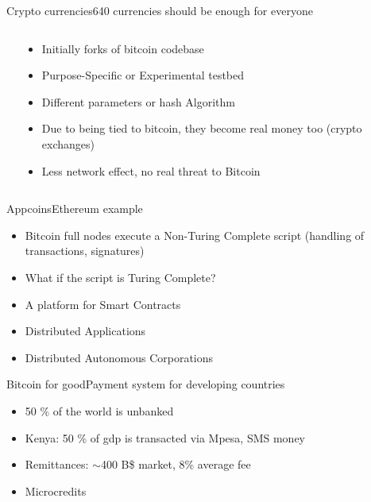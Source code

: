 \documentclass[english,compress]{beamer}
\begin{document}

\begin{frame}{Crypto currencies}{640 currencies should be enough for everyone}
 \begin{columns}
  \begin{column}{0.5 \textwidth}
  \end{column}
  
 \begin{column}{0.4 \textwidth}
   \begin{itemize}
    \item Initially forks of bitcoin codebase
    \item Purpose-Specific or Experimental testbed
    \item Different parameters or hash Algorithm
    \item Due to being tied to bitcoin, they become real money too (crypto exchanges)
    \item Less network effect, no real threat to Bitcoin
   \end{itemize}
  \end{column}
  \hfill
  \end{columns}
\end{frame}

\begin{frame}{Appcoins}{Ethereum example}
\begin{itemize}
 
 \item Bitcoin full nodes execute a Non-Turing Complete script (handling of transactions, signatures)
 \item What if the script is Turing Complete?
 \item A platform for Smart Contracts
 \item Distributed Applications
 \item Distributed Autonomous Corporations
 \end{itemize}

 
\end{frame}

\begin{frame}{Bitcoin for good}{Payment system for developing countries}
\begin{itemize}
 \item 50 \% of the world is unbanked
 \item Kenya: 50 \% of gdp is transacted via Mpesa, SMS money
 \item Remittances: $\sim$400 B\$ market, 8\% average fee
 \item Microcredits
\end{itemize}
\end{frame}
\end{document}
